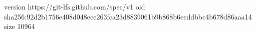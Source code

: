 version https://git-lfs.github.com/spec/v1
oid sha256:92d2b1756e408d048ece263fca23d8839061b9b868b6eeddbbc4b678d86aaa14
size 10964
